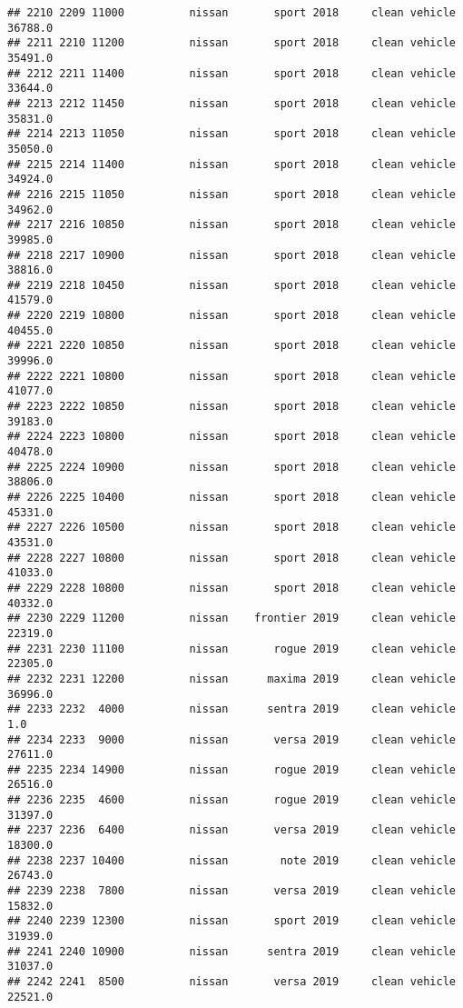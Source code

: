 \documentclass[
]{article}
\begin{document}
\begin{verbatim}
## 2210 2209 11000          nissan       sport 2018     clean vehicle   36788.0
## 2211 2210 11200          nissan       sport 2018     clean vehicle   35491.0
## 2212 2211 11400          nissan       sport 2018     clean vehicle   33644.0
## 2213 2212 11450          nissan       sport 2018     clean vehicle   35831.0
## 2214 2213 11050          nissan       sport 2018     clean vehicle   35050.0
## 2215 2214 11400          nissan       sport 2018     clean vehicle   34924.0
## 2216 2215 11050          nissan       sport 2018     clean vehicle   34962.0
## 2217 2216 10850          nissan       sport 2018     clean vehicle   39985.0
## 2218 2217 10900          nissan       sport 2018     clean vehicle   38816.0
## 2219 2218 10450          nissan       sport 2018     clean vehicle   41579.0
## 2220 2219 10800          nissan       sport 2018     clean vehicle   40455.0
## 2221 2220 10850          nissan       sport 2018     clean vehicle   39996.0
## 2222 2221 10800          nissan       sport 2018     clean vehicle   41077.0
## 2223 2222 10850          nissan       sport 2018     clean vehicle   39183.0
## 2224 2223 10800          nissan       sport 2018     clean vehicle   40478.0
## 2225 2224 10900          nissan       sport 2018     clean vehicle   38806.0
## 2226 2225 10400          nissan       sport 2018     clean vehicle   45331.0
## 2227 2226 10500          nissan       sport 2018     clean vehicle   43531.0
## 2228 2227 10800          nissan       sport 2018     clean vehicle   41033.0
## 2229 2228 10800          nissan       sport 2018     clean vehicle   40332.0
## 2230 2229 11200          nissan    frontier 2019     clean vehicle   22319.0
## 2231 2230 11100          nissan       rogue 2019     clean vehicle   22305.0
## 2232 2231 12200          nissan      maxima 2019     clean vehicle   36996.0
## 2233 2232  4000          nissan      sentra 2019     clean vehicle       1.0
## 2234 2233  9000          nissan       versa 2019     clean vehicle   27611.0
## 2235 2234 14900          nissan       rogue 2019     clean vehicle   26516.0
## 2236 2235  4600          nissan       rogue 2019     clean vehicle   31397.0
## 2237 2236  6400          nissan       versa 2019     clean vehicle   18300.0
## 2238 2237 10400          nissan        note 2019     clean vehicle   26743.0
## 2239 2238  7800          nissan       versa 2019     clean vehicle   15832.0
## 2240 2239 12300          nissan       sport 2019     clean vehicle   31939.0
## 2241 2240 10900          nissan      sentra 2019     clean vehicle   31037.0
## 2242 2241  8500          nissan       versa 2019     clean vehicle   22521.0

\end{verbatim}
\end{document}
